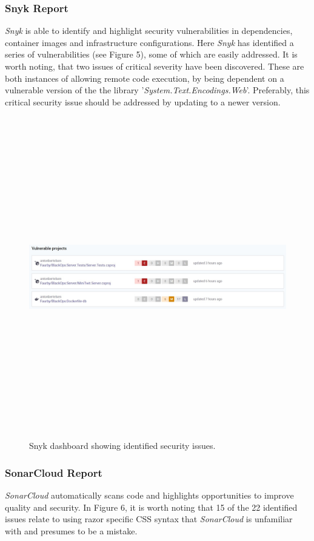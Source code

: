 \subsubsection{Snyk Report}
\textit{Snyk} is able to identify and highlight security vulnerabilities in dependencies, container images and infrastructure configurations. Here \textit{Snyk} has identified a series of vulnerabilities (see Figure 5), some of which are easily addressed. It is worth noting, that two issues of critical severity have been discovered. These are both instances of allowing remote code execution, by being dependent on a vulnerable version of the the library '\textit{System.Text.Encodings.Web}'. Preferably, this critical security issue should be addressed by updating to a newer version. 

\begin{figure}[H]
    \centering
    \includegraphics[width=16cm,height=14cm,keepaspectratio]{Diagrams/snyk.jpg}
    \caption{Snyk dashboard showing identified security issues.}
    \label{ComponentDiagram_1}
\end{figure}

\subsubsection{SonarCloud Report}
\textit{SonarCloud} automatically scans code and highlights opportunities to improve quality and security. In Figure 6, it is worth noting that 15 of the 22 identified issues relate to using razor specific CSS syntax that \textit{SonarCloud} is unfamiliar with and presumes to be a mistake.

